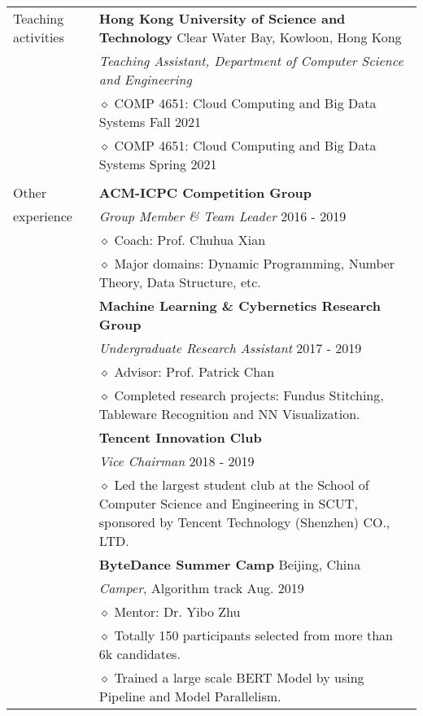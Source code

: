 \documentclass[letterpaper, 11pt]{article}
\begin{document}
\begin{longtable}{p{1in}p{5in}}

\nohyphens{Teaching activities}
& \textbf{Hong Kong University of Science and Technology} \hfill Clear Water Bay, Kowloon, Hong Kong \\
& \textit{Teaching Assistant, Department of Computer Science and Engineering} \\
& $\diamond$ COMP 4651: Cloud Computing and Big Data Systems \hfill Fall 2021 \\
& $\diamond$ COMP 4651: Cloud Computing and Big Data Systems \hfill Spring 2021 \\
& \\

{Other}
& \textbf{ACM-ICPC Competition Group} \\
{experience}
& \textit{Group Member \& Team Leader} \hfill 2016 - 2019 \\
& $\diamond$ Coach: Prof. Chuhua Xian \\
& $\diamond$ Major domains: Dynamic Programming, Number Theory, Data Structure, etc. \\

& \textbf{Machine Learning \& Cybernetics Research Group} \\
& \textit{Undergraduate Research Assistant} \hfill 2017 - 2019 \\
& $\diamond$ Advisor: Prof. Patrick Chan \\
& $\diamond$ Completed research projects: Fundus Stitching, Tableware Recognition and NN Visualization. \\

& \textbf{Tencent Innovation Club} \\
& \textit{Vice Chairman} \hfill 2018 - 2019 \\
& $\diamond$ Led the largest student club at the School of Computer Science and Engineering in SCUT, sponsored by Tencent Technology (Shenzhen) CO., LTD. \\

& \textbf{ByteDance Summer Camp} \hfill Beijing, China \\
& \textit{Camper}, Algorithm track \hfill Aug. 2019 \\
& $\diamond$ Mentor: Dr. Yibo Zhu \\
& $\diamond$ Totally 150 participants selected from more than 6k candidates. \\
& $\diamond$ Trained a large scale BERT Model by using Pipeline and Model Parallelism. \\


\end{longtable}
\end{document}
